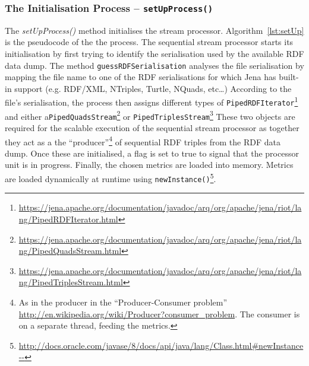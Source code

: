 
\subsubsection{The Initialisation Process – \texttt{setUpProcess()}}
The \emph{setUpProcess()} method initialises the stream processor.
Algorithm~\ref{lst:setUp} is the pseudocode of the the process.
The sequential stream processor starts its initialisation by first trying to identify the serialisation used by the available RDF data dump.
The method \texttt{guessRDFSerialisation} analyses the file serialisation by mapping the file name to one of the RDF serialisations for which Jena has built-in support (e.g. RDF/XML, NTriples, Turtle, NQuads, etc\dots)
According to the file's serialisation, the process then assigns different types of \texttt{PipedRDFIterator}\footnote{\url{https://jena.apache.org/documentation/javadoc/arq/org/apache/jena/riot/lang/PipedRDFIterator.html}} and either a\texttt{PipedQuadsStream}\footnote{\url{https://jena.apache.org/documentation/javadoc/arq/org/apache/jena/riot/lang/PipedQuadsStream.html}} or \texttt{PipedTriplesStream}\footnote{\url{https://jena.apache.org/documentation/javadoc/arq/org/apache/jena/riot/lang/PipedTriplesStream.html}} 
These two objects are required for the scalable execution of the sequential stream processor as together they act as a the ``producer''\footnote{As in the producer in the ``Producer-Consumer problem'' \url{http://en.wikipedia.org/wiki/Producer?consumer_problem}. The consumer is on a separate thread, feeding the metrics.} of sequential RDF triples from the RDF data dump.
Once these are initialised, a flag is set to true to signal that the processor unit is in progress.
Finally, the chosen metrics are loaded into memory.
Metrics are loaded dynamically at runtime using \texttt{newInstance()}\footnote{\url{http://docs.oracle.com/javase/8/docs/api/java/lang/Class.html#newInstance--}}. 

